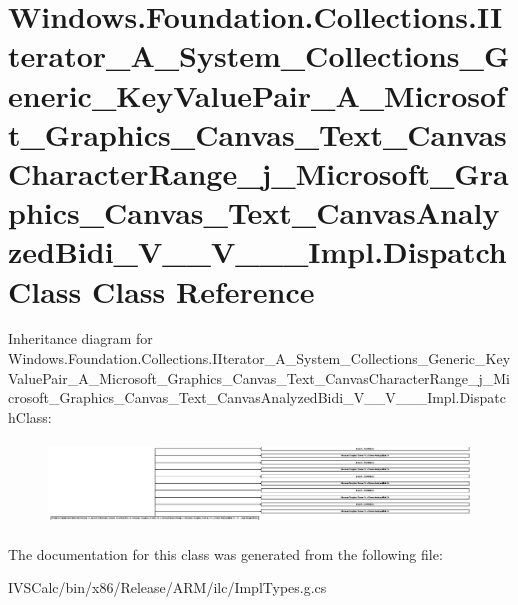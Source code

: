 \hypertarget{class_windows_1_1_foundation_1_1_collections_1_1_i_iterator___a___system___collections___generic4c0c2c7f30bf8cd4112a90ff01152cdb}{}\section{Windows.\+Foundation.\+Collections.\+I\+Iterator\+\_\+\+A\+\_\+\+System\+\_\+\+Collections\+\_\+\+Generic\+\_\+\+Key\+Value\+Pair\+\_\+\+A\+\_\+\+Microsoft\+\_\+\+Graphics\+\_\+\+Canvas\+\_\+\+Text\+\_\+\+Canvas\+Character\+Range\+\_\+j\+\_\+\+Microsoft\+\_\+\+Graphics\+\_\+\+Canvas\+\_\+\+Text\+\_\+\+Canvas\+Analyzed\+Bidi\+\_\+\+V\+\_\+\+\_\+\+V\+\_\+\+\_\+\+\_\+\+Impl.\+Dispatch\+Class Class Reference}
\label{class_windows_1_1_foundation_1_1_collections_1_1_i_iterator___a___system___collections___generic4c0c2c7f30bf8cd4112a90ff01152cdb}
Inheritance diagram for Windows.\+Foundation.\+Collections.\+I\+Iterator\+\_\+\+A\+\_\+\+System\+\_\+\+Collections\+\_\+\+Generic\+\_\+\+Key\+Value\+Pair\+\_\+\+A\+\_\+\+Microsoft\+\_\+\+Graphics\+\_\+\+Canvas\+\_\+\+Text\+\_\+\+Canvas\+Character\+Range\+\_\+j\+\_\+\+Microsoft\+\_\+\+Graphics\+\_\+\+Canvas\+\_\+\+Text\+\_\+\+Canvas\+Analyzed\+Bidi\+\_\+\+V\+\_\+\+\_\+\+V\+\_\+\+\_\+\+\_\+\+Impl.\+Dispatch\+Class\+:\begin{figure}[H]
\begin{center}
\leavevmode
\includegraphics[height=2.241631cm]{class_windows_1_1_foundation_1_1_collections_1_1_i_iterator___a___system___collections___generic4c0c2c7f30bf8cd4112a90ff01152cdb}
\end{center}
\end{figure}


The documentation for this class was generated from the following file\+:\begin{DoxyCompactItemize}
\item 
I\+V\+S\+Calc/bin/x86/\+Release/\+A\+R\+M/ilc/Impl\+Types.\+g.\+cs\end{DoxyCompactItemize}
